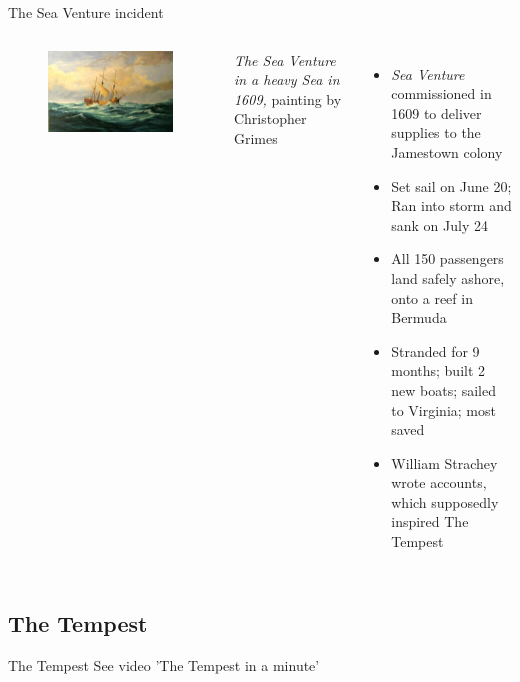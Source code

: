 \documentclass{beamer}
\begin{document}
\begin{frame}{The Sea Venture incident}
  \begin{columns}[c]
    \begin{figure}[htp]
      \begin{center}
        \centering
        \includegraphics[scale=0.29]{seaventure.jpg}
      \end{center}
    \end{figure}
    \footnotesize{\emph{The Sea Venture in a heavy Sea in 1609,} painting by Christopher Grimes}

  \begin{itemize}
  \item \emph{Sea Venture} commissioned in 1609 to deliver supplies to the Jamestown colony
  \item Set sail on June 20; Ran into storm and sank on July 24
  \item All 150 passengers land safely ashore, onto a reef in Bermuda
  \item Stranded for 9 months; built 2 new boats; sailed to Virginia; most saved
  \item William Strachey wrote accounts, which supposedly inspired The Tempest
  \end{itemize}
  \end{columns}
\end{frame}

\subsection{The Tempest}
\begin{frame}{The Tempest}
  See video 'The Tempest in a minute'
\end{frame}
\end{document}
